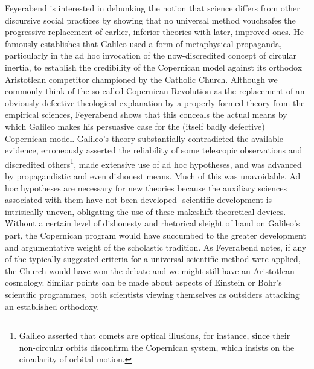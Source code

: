 Feyerabend is interested in debunking the notion that science differs from other discursive social practices by showing that no universal method vouchsafes the progressive replacement of earlier, inferior theories with later, improved ones. He famously establishes that Galileo used a form of metaphysical propaganda, particularly in the ad hoc invocation of the now-discredited concept of circular inertia, to establish the credibility of the Copernican model against its orthodox Aristotlean competitor championed by the Catholic Church. Although we commonly think of the so-called Copernican Revolution as the replacement of an obviously defective theological explanation by a properly formed theory from the empirical sciences, Feyerabend shows that this conceals the actual means by which Galileo makes his persuasive case for the (itself badly defective) Copernican model.  Galileo's theory substantially contradicted the available evidence, erroneously asserted the reliability of some telescopic observations and discredited others\footnote{Galileo asserted that comets are optical illusions, for instance, since their non-circular orbits disconfirm the Copernican system, which insists on the circularity of orbital motion.}, made extensive use of ad hoc hypotheses, and was advanced by propagandistic and even dishonest means. Much of this was unavoidable. Ad hoc hypotheses are necessary for new theories because the auxiliary sciences associated with them have not been developed- scientific development is intrisically uneven, obligating the use of these makeshift theoretical devices. Without a certain level of dishonesty and rhetorical sleight of hand on Galileo's part, the Copernican program would have succumbed to the greater development and argumentative weight of the scholastic tradition. As Feyerabend notes, if any of the typically suggested criteria for a universal scientific method were applied, the Church would have won the debate and we might still have an Aristotlean cosmology. Similar points can be made about aspects of Einstein or Bohr's scientific programmes, both scientists viewing themselves as outsiders attacking an established orthodoxy.

